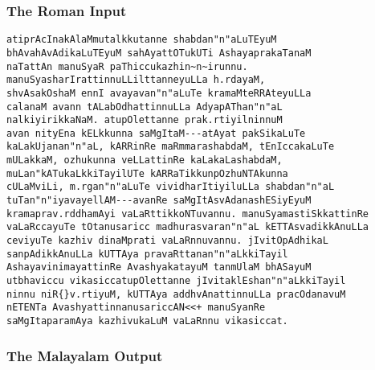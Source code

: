 \documentclass[12pt]{article}
\begin{document}
{\subsubsection{The Roman Input}

\begin{verbatim}
atiprAcInakAlaMmutalkkutanne shabdan"n"aLuTEyuM
bhAvahAvAdikaLuTEyuM sahAyattOTukUTi AshayaprakaTanaM
naTattAn manuSyaR paThiccukazhin~n~irunnu.
manuSyasharIrattinnuLLilttanneyuLLa h.rdayaM,
shvAsakOshaM ennI avayavan"n"aLuTe kramaMteRRAteyuLLa
calanaM avann tALabOdhattinnuLLa AdyapAThan"n"aL
nalkiyirikkaNaM. atupOlettanne prak.rtiyilninnuM
avan nityEna kELkkunna saMgItaM---atAyat pakSikaLuTe
kaLakUjanan"n"aL, kARRinRe maRmmarashabdaM, tEnIccakaLuTe
mULakkaM, ozhukunna veLLattinRe kaLakaLashabdaM,
muLan"kATukaLkkiTayilUTe kARRaTikkunpOzhuNTAkunna
cULaMviLi, m.rgan"n"aLuTe vividharItiyiluLLa shabdan"n"aL
tuTan"n"iyavayellAM---avanRe saMgItAsvAdanashESiyEyuM
kramaprav.rddhamAyi vaLaRttikkoNTuvannu. manuSyamastiSkkattinRe
vaLaRccayuTe tOtanusaricc madhurasvaran"n"aL kETTAsvadikkAnuLLa
ceviyuTe kazhiv dinaMprati vaLaRnnuvannu. jIvitOpAdhikaL
sanpAdikkAnuLLa kUTTAya pravaRttanan"n"aLkkiTayil
AshayavinimayattinRe AvashyakatayuM tanmUlaM bhASayuM
utbhaviccu vikasiccatupOlettanne jIvitaklEshan"n"aLkkiTayil
ninnu niR{}v.rtiyuM, kUTTAya addhvAnattinnuLLa pracOdanavuM
nETENTa AvashyattinnanusariccAN<<+ manuSyanRe
saMgItaparamAya kazhivukaLuM vaLaRnnu vikasiccat.
\end{verbatim}

\subsubsection{The Malayalam Output}

}
\end{document}
